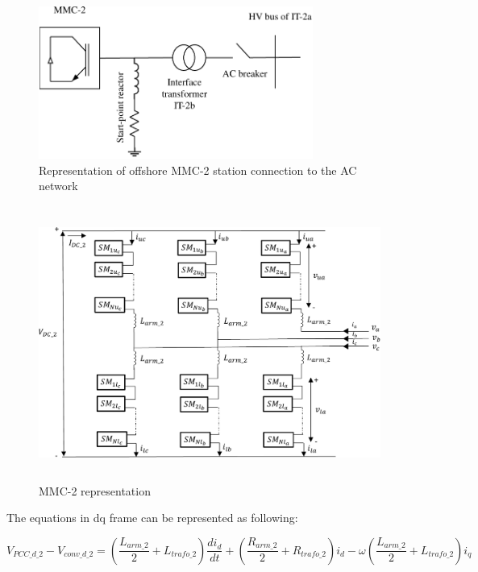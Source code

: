 \begin{figure}[H]
\centering
    \includegraphics[height = 5cm,width = 9cm]{Diagrams/Chapter_4/MMC_pow_system_1_new.pdf}
    \caption{Representation of offshore MMC-2 station connection to the AC network \cite{saad2015modelisation}}
    \label{fig:MMC_pow_system_1}
\end{figure}

\begin{figure}[H]
\centering
    \includegraphics[height = 9cm,width = 13.5cm]{Diagrams/Chapter_4/MMC_pow_system_2.pdf}
    \caption{MMC-2 representation \cite{saad2015modelisation}}
    \label{fig:MMC_pow_system_2}
\end{figure}

The equations in \gls{dq} frame can be represented as following:

\begin{equation}
    V_{PCC\_d\_2} - V_{conv\_d\_2} = \left(\frac{L_{arm\_2}}{2} + L_{trafo\_2}\right)\frac{di_{d}}{dt} +\left (\frac{R_{arm\_2}}{2}+R_{trafo\_2}\right)i_d-\omega\left(\frac{L_{arm\_2}}{2}+L_{trafo\_2}\right)i_q
\end{equation}

